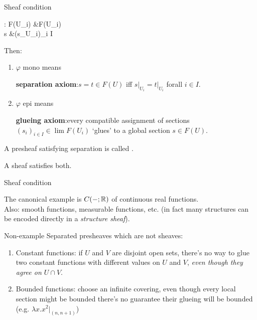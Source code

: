 \begin{frame}{Sheaf condition}
	\begin{eqalign*}
		\varphi : F(\colim U_i) &\longto \lim F(U_i)\\
		s &\longmapsto (s\vert_{U_i})_{i \in I}
	\end{eqalign*}
	Then:
	\begin{enumerate}
		\item $\varphi$ mono means
		\begin{center}
			\textbf{separation axiom}:\quad $s=t \in F(U)$ iff $s\vert_{U_i} = t\vert_{U_i}$ forall $i \in I$.
		\end{center}
		\item $\varphi$ epi means
		\begin{center}
			\textbf{glueing axiom}:\quad every compatible assignment of sections $(s_i)_{i \in I} \in \lim F(U_i)$ `glues' to a global section $s \in F(U)$.
		\end{center}
	\end{enumerate}
	\vfill
	A presheaf satisfying separation is called .

	A sheaf satisfies both.
\end{frame}

\begin{frame}{Sheaf condition}
	\begin{example}
		The canonical example is $C(-; \mathbb{R})$ of continuous real functions.\\
		Also: smooth functions, measurable functions, etc. (in fact many structures can be encoded directly in a \emph{structure sheaf}).
	\end{example}
	\begin{block}{Non-example}
		Separated presheaves which are not sheaves:
		\begin{enumerate}
			\item Constant functions: if $U$ and $V$ are disjoint open sets, there's no way to glue two constant functions with different values on $U$ and $V$, \emph{even though they agree on $U \cap V$}.
			\item Bounded functions: choose an infinite covering, even though every local section might be bounded there's no guarantee their glueing will be bounded (e.g. $\lambda x.x^2\vert_{(n,n+1)}$)
		\end{enumerate}
	\end{block}
\end{frame}

